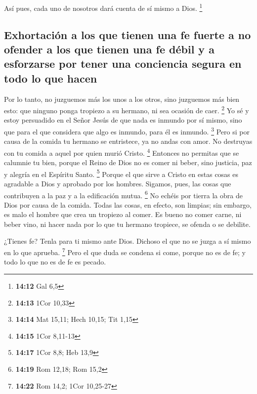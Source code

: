  Así pues, cada uno de nosotros dará cuenta de sí mismo a
Dios. \footnote{\textbf{14:12} Gal 6,5}

\hypertarget{exhortaciuxf3n-a-los-que-tienen-una-fe-fuerte-a-no-ofender-a-los-que-tienen-una-fe-duxe9bil-y-a-esforzarse-por-tener-una-conciencia-segura-en-todo-lo-que-hacen}{%
\subsection{Exhortación a los que tienen una fe fuerte a no ofender a
los que tienen una fe débil y a esforzarse por tener una conciencia
segura en todo lo que
hacen}\label{exhortaciuxf3n-a-los-que-tienen-una-fe-fuerte-a-no-ofender-a-los-que-tienen-una-fe-duxe9bil-y-a-esforzarse-por-tener-una-conciencia-segura-en-todo-lo-que-hacen}}

 Por lo tanto, no juzguemos más los unos a los otros,
sino juzguemos más bien esto: que ninguno ponga tropiezo a su hermano,
ni sea ocasión de caer. \footnote{\textbf{14:13} 1Cor 10,33}
 Yo sé y estoy persuadido en el Señor Jesús de que nada
es inmundo por sí mismo, sino que para el que considera que algo es
inmundo, para él es inmundo. \footnote{\textbf{14:14} Mat 15,11; Hech
  10,15; Tit 1,15}  Pero si por causa de la comida tu
hermano se entristece, ya no andas con amor. No destruyas con tu comida
a aquel por quien murió Cristo. \footnote{\textbf{14:15} 1Cor 8,11-13}
 Entonces no permitas que se calumnie tu bien,
 porque el Reino de Dios no es comer ni beber, sino
justicia, paz y alegría en el Espíritu Santo. \footnote{\textbf{14:17}
  1Cor 8,8; Heb 13,9}  Porque el que sirve a Cristo en
estas cosas es agradable a Dios y aprobado por los hombres.
 Sigamos, pues, las cosas que contribuyen a la paz y a la
edificación mutua. \footnote{\textbf{14:19} Rom 12,18; Rom 15,2}
 No echéis por tierra la obra de Dios por causa de la
comida. Todas las cosas, en efecto, son limpias; sin embargo, es malo el
hombre que crea un tropiezo al comer.  Es bueno no comer
carne, ni beber vino, ni hacer nada por lo que tu hermano tropiece, se
ofenda o se debilite.

 ¿Tienes fe? Tenla para ti mismo ante Dios. Dichoso el
que no se juzga a sí mismo en lo que aprueba. \footnote{\textbf{14:22}
  Rom 14,2; 1Cor 10,25-27}  Pero el que duda se condena
si come, porque no es de fe; y todo lo que no es de fe es pecado.

